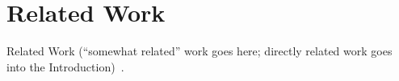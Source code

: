 \section{Related Work}
\label{sec:relwork}

Related Work (``somewhat related'' work goes here; directly related work
goes into the Introduction)~\cite{dsd13}.
